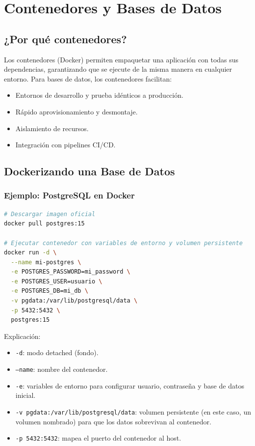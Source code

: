 \documentclass[12pt,a4paper,openany,oneside]{book}
\begin{document}
\chapter{Contenedores y Bases de Datos}
\section{¿Por qué contenedores?}
Los contenedores (Docker) permiten empaquetar una aplicación con todas sus dependencias, garantizando que se ejecute de la misma manera en cualquier entorno. Para bases de datos, los contenedores facilitan:
\begin{itemize}
    \item Entornos de desarrollo y prueba idénticos a producción.
    \item Rápido aprovisionamiento y desmontaje.
    \item Aislamiento de recursos.
    \item Integración con pipelines CI/CD.
\end{itemize}

\section{Dockerizando una Base de Datos}
\subsection{Ejemplo: PostgreSQL en Docker}
\begin{lstlisting}[language=Bash]
# Descargar imagen oficial
docker pull postgres:15

# Ejecutar contenedor con variables de entorno y volumen persistente
docker run -d \
  --name mi-postgres \
  -e POSTGRES_PASSWORD=mi_password \
  -e POSTGRES_USER=usuario \
  -e POSTGRES_DB=mi_db \
  -v pgdata:/var/lib/postgresql/data \
  -p 5432:5432 \
  postgres:15
\end{lstlisting}
Explicación:
\begin{itemize}
    \item \texttt{-d}: modo detached (fondo).
    \item \texttt{--name}: nombre del contenedor.
    \item \texttt{-e}: variables de entorno para configurar usuario, contraseña y base de datos inicial.
    \item \texttt{-v pgdata:/var/lib/postgresql/data}: volumen persistente (en este caso, un volumen nombrado) para que los datos sobrevivan al contenedor.
    \item \texttt{-p 5432:5432}: mapea el puerto del contenedor al host.
\end{itemize}
\end{document}
